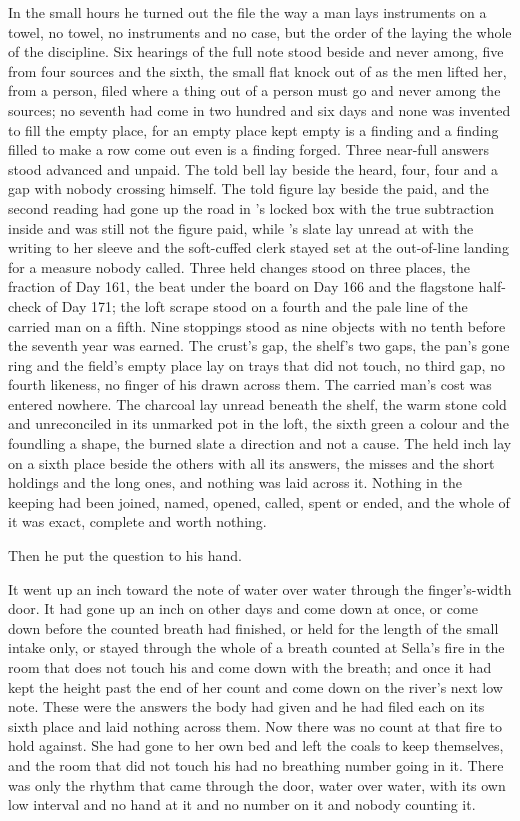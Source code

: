 In the small hours he turned out the file the way a man lays instruments on a towel, no towel, no instruments and no case, but the order of the laying the whole of the discipline. Six hearings of the full note stood beside and never among, five from four sources and the sixth, the small flat knock out of  as the men lifted her, from a person, filed where a thing out of a person must go and never among the sources; no seventh had come in two hundred and six days and none was invented to fill the empty place, for an empty place kept empty is a finding and a finding filled to make a row come out even is a finding forged. Three near-full answers stood advanced and unpaid. The told bell lay beside the heard, four, four and a gap with nobody crossing himself. The told figure lay beside the paid, and the second reading had gone up the road in 's locked box with the true subtraction inside and was still not the figure paid, while 's slate lay unread at  with the writing to her sleeve and the soft-cuffed clerk stayed set at the out-of-line landing for a measure nobody called. Three held changes stood on three places, the fraction of Day 161, the beat under the board on Day 166 and the flagstone half-check of Day 171; the loft scrape stood on a fourth and the pale line of the carried man on a fifth. Nine stoppings stood as nine objects with no tenth before the seventh year was earned. The crust's gap, the shelf's two gaps, the pan's gone ring and the field's empty place lay on trays that did not touch, no third gap, no fourth likeness, no finger of his drawn across them. The carried man's cost was entered nowhere. The charcoal lay unread beneath the shelf, the warm stone cold and unreconciled in its unmarked pot in the loft, the sixth green a colour and the foundling a shape, the burned slate a direction and not a cause. The held inch lay on a sixth place beside the others with all its answers, the misses and the short holdings and the long ones, and nothing was laid across it. Nothing in the keeping had been joined, named, opened, called, spent or ended, and the whole of it was exact, complete and worth nothing.

Then he put the question to his hand.

It went up an inch toward the note of water over water through the finger's-width door. It had gone up an inch on other days and come down at once, or come down before the counted breath had finished, or held for the length of the small intake only, or stayed through the whole of a breath counted at Sella's fire in the room that does not touch his and come down with the breath; and once it had kept the height past the end of her count and come down on the river's next low note. These were the answers the body had given and he had filed each on its sixth place and laid nothing across them. Now there was no count at that fire to hold against. She had gone to her own bed and left the coals to keep themselves, and the room that did not touch his had no breathing number going in it. There was only the rhythm that came through the door, water over water, with its own low interval and no hand at it and no number on it and nobody counting it.

